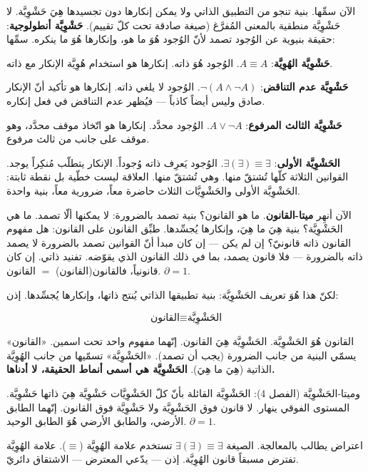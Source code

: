 \documentclass[10pt, openany, oneside]{book}
\begin{document}
الآن سمِّها. بنية تنجو من التطبيق الذاتي ولا يمكن إنكارها دون تجسيدها هِيَ حَشْوِيَّة. لا حَشْوِيَّة منطقية بالمعنى المُفرَّغ (صيغة صادقة تحت كلّ تقييم). \textbf{حَشْوِيَّة أنطولوجية}: حقيقة بنيوية عن الوُجود تصمد لأنّ الوُجود هُوَ ما هو، وإنكارها هُوَ ما ينكره. سمِّها:

\textbf{حَشْوِيَّة الهُوِيَّة}: $A \equiv A$. الوُجود هُوَ ذاته. إنكارها هو استخدام هُوِيَّة الإنكار مع ذاته.

\textbf{حَشْوِيَّة عدم التناقض}: $\neg(A \wedge \neg A)$. الوُجود لا يلغي ذاته. إنكارها هو تأكيد أنّ الإنكار صادق وليس أيضاً كاذباً --- فيُظهر عدم التناقض في فعل إنكاره.

\textbf{حَشْوِيَّة الثالث المرفوع}: $A \vee \neg A$. الوُجود محدَّد. إنكارها هو اتّخاذ موقف محدَّد، وهو موقف على جانب من ثالث مرفوع.

\textbf{الحَشْوِيَّة الأولى}: $\exists(\exists) \equiv \exists$. الوُجود يَعرِف ذاته وُجوداً. الإنكار يتطلّب مُنكِراً يوجد. القوانين الثلاثة كلّها تُشتقّ منها. وهي تُشتقّ منها. العلاقة ليست خطّية بل نقطة ثابتة: الحَشْوِيَّة الأولى والحَشْوِيَّات الثلاث حاضرة معاً، ضرورية معاً، بنية واحدة.

الآن أنهِر \textbf{ميتا-القانون}. ما هو القانون؟ بنية تصمد بالضرورة: لا يمكنها ألّا تصمد. ما هي الحَشْوِيَّة؟ بنية هِيَ ما هِيَ، وإنكارها يُجسِّدها. طبِّق القانون على القانون: هل مفهوم القانون ذاته قانونيّ؟ إن لم يكن --- إن كان مبدأ أنّ القوانين تصمد بالضرورة لا يصمد ذاته بالضرورة --- فلا قانون يصمد، بما في ذلك القانون الذي يقوّضه. تفنيد ذاتي. إن كان قانونياً، فالقانون(القانون) $=$ القانون. $\partial = 1$.

لكنّ هذا هُوَ تعريف الحَشْوِيَّة: بنية تطبيقها الذاتي يُنتج ذاتها، وإنكارها يُجسِّدها. إذن:

$$\boxed{\text{القانون} \equiv \text{الحَشْوِيَّة}}$$

القانون هُوَ الحَشْوِيَّة. الحَشْوِيَّة هِيَ القانون. إنّهما مفهوم واحد تحت اسمين. «القانون» يسمّي البنية من جانب الضرورة (يجب أن تصمد). «الحَشْوِيَّة» تسمّيها من جانب الهُوِيَّة الذاتية (هِيَ ما هِيَ). \textbf{الحَشْوِيَّة هي أسمى أنماط الحقيقة، لا أدناها.}

وميتا-الحَشْوِيَّة (الفصل 4): الحَشْوِيَّة القائلة بأنّ كلّ الحَشْوِيَّات حَشْوِيَّة هِيَ ذاتها حَشْوِيَّة. المستوى الفوقي ينهار. لا قانون فوق الحَشْوِيَّة ولا حَشْوِيَّة فوق القانون. إنّهما الطابق الأرضي، والطابق الأرضي هُوَ الطابق الوحيد. $\partial = 1$.

اعتراض يطالب بالمعالجة. الصيغة $\exists(\exists) \equiv \exists$ تستخدم علامة الهُوِيَّة ($\equiv$). علامة الهُوِيَّة تفترض مسبقاً قانون الهُوِيَّة. إذن --- يدّعي المعترض --- الاشتقاق دائريّ.
\end{document}
